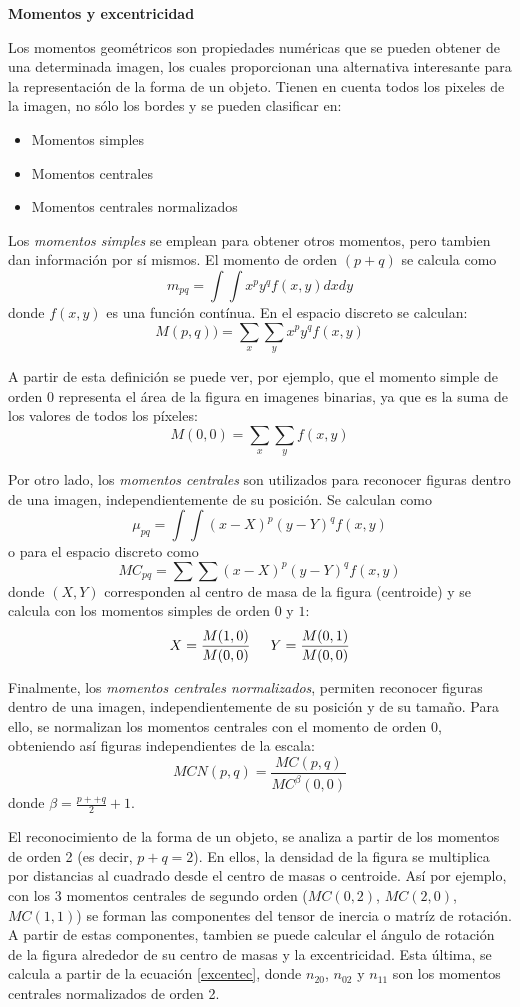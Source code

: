 \vspace{10 mm}
\textbf{Momentos y excentricidad}\cite{imageMoments}

Los momentos geométricos son propiedades numéricas que se pueden obtener de una determinada imagen, los cuales proporcionan una alternativa interesante para la representación de la forma de un objeto. Tienen en cuenta todos los pixeles de la imagen, no sólo los bordes y se pueden clasificar en:

\begin{itemize}
\item Momentos simples
\item Momentos centrales
\item Momentos centrales normalizados
\end{itemize}

Los \textit{momentos simples} se emplean para obtener otros momentos, pero tambien dan información por sí mismos. El momento de orden $(p+q)$ se calcula como $$m_{pq}={\int}{\int}x^py^qf(x,y)dxdy$$ donde $f(x,y)$ es una función contínua. En el espacio discreto se calculan: $$M(p,q))={\sum}_x{\sum}_yx^py^qf(x,y)$$

A partir de esta definición se puede ver, por ejemplo, que el momento simple de orden 0 representa el área de la figura en imagenes binarias, ya que es la suma de los valores de todos los píxeles: $$M(0,0) = {\sum}_x{\sum}_yf(x,y)$$

Por otro lado, los \textit{momentos centrales} son utilizados para reconocer figuras dentro de una imagen, independientemente de su posición. Se calculan como $${\mu}_{pq}={\int}{\int}(x-X)^p(y-Y)^qf(x,y)$$ o para el espacio discreto como $${MC}_{pq}={\sum}{\sum}(x-X)^p(y-Y)^qf(x,y)$$ donde $(X,Y)$ corresponden al centro de masa de la figura (centroide) y se calcula con los momentos simples de orden $0$ y $1$: $$X=\frac{M(1,0)}{M(0,0)} \hspace{5 mm} Y=\frac{M(0,1)}{M(0,0)}$$

Finalmente, los \textit{momentos centrales normalizados}, permiten reconocer figuras dentro de una imagen, independientemente de su posición y de su tamaño. Para ello, se normalizan los momentos centrales con el momento de orden $0$, obteniendo así figuras independientes de la escala: $$MCN(p,q) = \frac{MC(p,q)}{MC^{\beta}(0,0)}$$ donde ${\beta}=\frac{p++q}{2}+1$.

El reconocimiento de la forma de un objeto, se analiza a partir de los momentos de orden 2 (es decir, $p+q=2$). En ellos, la densidad de la figura se multiplica por distancias al cuadrado desde el centro de masas o centroide. Así por ejemplo, con los 3 momentos centrales de segundo orden ($MC(0,2)$, $MC(2,0)$, $MC(1,1)$) se forman las componentes del tensor de inercia o matríz de rotación. A partir de estas componentes, tambien se puede calcular el ángulo de rotación de la figura alrededor de su centro de masas y la excentricidad. Esta última, se calcula a partir de la ecuación \ref{excentec}, donde $n_{20}$, $n_{02}$ y $n_{11}$ son los momentos centrales normalizados de orden 2.

